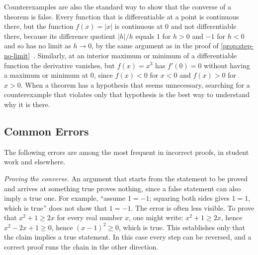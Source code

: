 \begin{table}
\end{table}

Counterexamples are also the standard way to show that the converse of a theorem is false. Every function that is differentiable at a point is continuous there, but the function $f(x)=|x|$ is continuous at $0$ and not differentiable there, because its difference quotient $|h|/h$ equals $1$ for $h>0$ and $-1$ for $h<0$ and so has no limit as $h\to0$, by the same argument as in the proof of \cref{prop:step-no-limit}~\cite{spivak2008calculus}. Similarly, at an interior maximum or minimum of a differentiable function the derivative vanishes, but $f(x)=x^3$ has $f'(0)=0$ without having a maximum or minimum at $0$, since $f(x)<0$ for $x<0$ and $f(x)>0$ for $x>0$. When a theorem has a hypothesis that seems unnecessary, searching for a counterexample that violates only that hypothesis is the best way to understand why it is there.

\subsection{Common Errors}

The following errors are among the most frequent in incorrect proofs, in student work and elsewhere.

\emph{Proving the converse.} An argument that starts from the statement to be proved and arrives at something true proves nothing, since a false statement can also imply a true one. For example, ``assume $1=-1$; squaring both sides gives $1=1$, which is true'' does not show that $1=-1$. The error is often less visible. To prove that $x^2+1\ge2x$ for every real number $x$, one might write: $x^2+1\ge2x$, hence $x^2-2x+1\ge0$, hence $(x-1)^2\ge0$, which is true. This establishes only that the claim implies a true statement. In this case every step can be reversed, and a correct proof runs the chain in the other direction.

